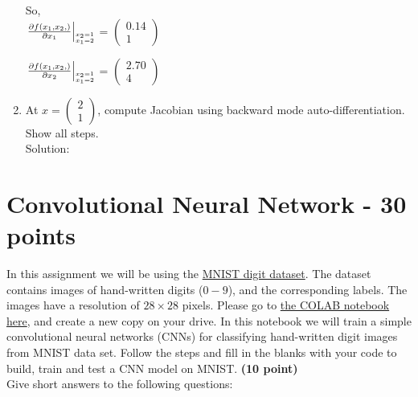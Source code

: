 \documentclass[12pt]{article}
\begin{document}
\begin{enumerate}[label=(\roman*)]
So, \\

    \(
    \left. \frac{\partial f(x_1,x_2,)}{\partial x_1} \right|_{%
   \stackon[1pt]{$\scriptscriptstyle x_1=2$}{$\scriptscriptstyle x_2=1$}}
   \)
   = $
   \begin{pmatrix}
   0.14\\1
   \end{pmatrix}$

   \(
    \left. \frac{\partial f(x_1,x_2,)}{\partial x_2} \right|_{%
   \stackon[1pt]{$\scriptscriptstyle x_1=2$}{$\scriptscriptstyle x_2=1$}}
   \) = $
   \begin{pmatrix}
   2.70\\ 4
   \end{pmatrix}$

\newpage

\item At 
$x=
\begin{pmatrix}
2\\1
\end{pmatrix}$, compute Jacobian using backward mode auto-differentiation. Show all steps.\\

Solution:\\




\end{enumerate}


\section{Convolutional Neural Network - 30 points}
In this assignment we will be using the \href{https://www.tensorflow.org/datasets/catalog/mnist}{MNIST digit dataset}. The dataset contains images of hand-written digits ($0-9$), and the corresponding labels. The images have a resolution of $28\times 28$ pixels.
Please go to \href{https://colab.research.google.com/drive/15QluTY841KoWqVh1CQ3lM6gKrtJvdRGC#scrollTo=_ut4_8RNi1oU}{the COLAB notebook here}, and create a new copy on your drive. In this notebook we will train a simple convolutional neural networks (CNNs) for classifying hand-written digit images from MNIST data set. Follow the steps and fill in the blanks with your code to build, train and test a CNN model on MNIST. \textbf{(10 point)}\\ \newline
\noindent Give short answers to the following questions:
\end{document}
